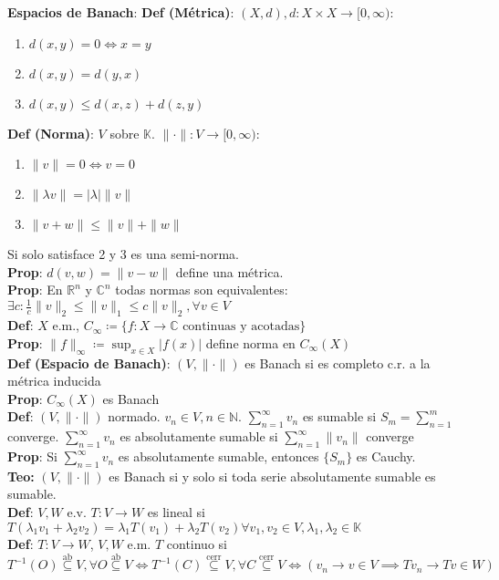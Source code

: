 \documentclass[9pt, letterpaper]{extarticle}
\newcommand{\N}{\mathbb{N}}
\newcommand{\C}{\mathbb{C}}
\newcommand{\R}{\mathbb{R}}
\newcommand{\K}{\mathbb{K}}
\begin{document}
\begin{multicols*}{2}

\textbf{Espacios de Banach}: \textbf{Def (Métrica)}: $(X,d), d:X\times X\to [0,\infty)$:
\begin{enumerate}
	\item $d(x,y)=0 \Leftrightarrow x=y$
	\item $d(x,y)=d(y,x)$
	\item $d(x,y)\leq d(x,z)+d(z,y)$
\end{enumerate}
\textbf{Def (Norma)}: $V$ sobre $\K$. $\|\cdot\|:V\to [0,\infty)$:
\begin{enumerate}
	\item $\|v\|=0 \Leftrightarrow v=0$
	\item $\|\lambda v\|=|\lambda|\|v\|$
	\item $\|v+w\|\leq \|v\|+\|w\|$
\end{enumerate}
Si solo satisface 2 y 3 es una semi-norma.\\
\textbf{Prop}: $d(v,w)=\|v-w\|$ define una métrica.\\
\textbf{Prop}: En $\R^n$ y $\C^n$ todas normas son equivalentes: $\exists c:\frac{1}{c}\|v\|_2\leq \|v\|_1\leq c\|v\|_2,\forall v\in V$\\
\textbf{Def}: $X$ e.m., $C_\infty\coloneqq\{f:X\to\C\text{ continuas y acotadas}\}$\\
\textbf{Prop}: $\|f\|_\infty\coloneqq \sup_{x\in X}|f(x)|$ define norma en $C_\infty(X)$\\
\textbf{Def (Espacio de Banach)}: $(V,\|\cdot\|)$ es Banach si es completo c.r. a la métrica inducida\\
\textbf{Prop}: $C_\infty(X)$ es Banach\\
\textbf{Def}: $(V,\|\cdot\|)$ normado. $v_n\in V,n\in\N$. $\sum_{n=1}^\infty v_n$ es sumable si $S_m=\sum_{n=1}^m$ converge. $\sum_{n=1}^\infty v_n$ es absolutamente sumable si $\sum_{n=1}^\infty \|v_n\|$ converge\\
\textbf{Prop}: Si $\sum_{n=1}^\infty v_n$ es absolutamente sumable, entonces $\{S_m\}$ es Cauchy.\\
\textbf{Teo:} $(V,\|\cdot\|)$ es Banach si y solo si toda serie absolutamente sumable es sumable.\\
\textbf{Def}: $V,W$ e.v. $T:V\to W$ es lineal si $T(\lambda_1v_1+\lambda_2v_2)=\lambda_1T(v_1)+\lambda_2T(v_2)\forall v_1,v_2\in V,\lambda_1,\lambda_2\in\K$\\
\textbf{Def}: $T:V\to W$, $V,W$ e.m. $T$ continuo si $T^{-1}(O)\overset{\text{ab}}{\subseteq} V,\forall O\overset{\text{ab}}{\subseteq} V\iff T^{-1}(C)\overset{\text{cerr}}{\subseteq} V,\forall C\overset{\text{cerr}}{\subseteq} V\iff (v_n\to v\in V\implies Tv_n\to Tv\in W)$\\

\end{multicols*}
\end{document}
